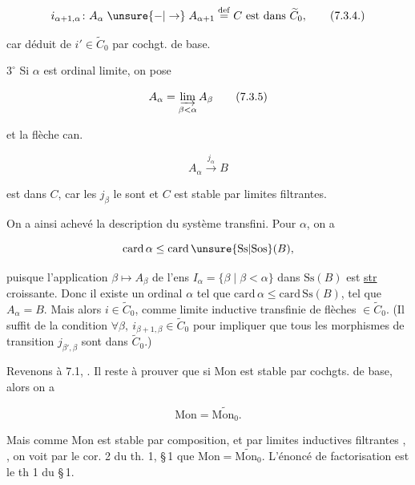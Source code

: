 \[
i_{\alpha+1,\alpha}\colon A_\alpha\mathrel{\unsure{-|\to}} A_{\alpha+1}\overset{\mathrm{def}}=C\ \text{est dans }\widetilde C_0,\tag*{(7.3.4.)}
\]

car déduit de $i'\in\widetilde C_0$ par cochgt. de base.

\textcircled{$3^\circ$} Si $\alpha$ est ordinal limite, on pose

\[
A_\alpha=\varinjlim_{\beta<\alpha} A_\beta\tag*{(7.3.5)}
\]


et la flèche can.

\[
A_\alpha\xrightarrow{j_\alpha}B
\]

est dans $C$, car les $j_\beta$ le sont et $C$ est stable par limites  filtrantes. 

On a ainsi achevé la description du système transfini. Pour  $\alpha$, on a

\[
\mathrm{card}\,\alpha\leq\mathrm{card}\,\unsure{\mathrm{Ss}|\mathrm{Sos}}(B),
\]

puisque l'application $\beta\longmapsto A_\beta$  de l'ens $I_\alpha=\{\beta\mid\beta<\alpha\}$ dans $\mathrm{Ss}(B)$ est \uline{str} croissante. Donc il existe un ordinal $\alpha$ tel que $\mathrm{card}\,\alpha\leq\mathrm{card}\,\mathrm{Ss}(B)$, tel que $A_\alpha=B$.  Mais alors $i\in\widetilde C_0$, comme limite inductive  transfinie de flèches $\in\widetilde C_0$. (Il suffit de la condition $\forall\beta,\ i_{\beta+1,\beta}\in\widetilde C_0$ pour impliquer que tous les morphismes de transition $j_{\beta',\beta}$ sont dans $\widetilde C_0$.)

Revenons à 7.1,  . Il reste à prouver que si $\mathrm{Mon}$ est stable par cochgts. de base, alors on a 

\[
\mathrm{Mon}=\widetilde{\mathrm{Mon}_0}.
\]

Mais comme $\mathrm{Mon}$ est  stable par composition, et par limites inductives filtrantes ,  , on voit par le cor. 2 du th. 1, \S\,1  que $\mathrm{Mon}=\widetilde{\mathrm{Mon}_0}$. L'énoncé de factorisation est le th 1 du \S\,1.

